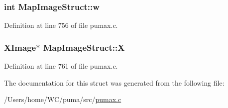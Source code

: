 \hypertarget{struct_map_image_struct_a231ed4c4f5df4b3c414fe643d139bea8}{
\subsubsection[{w}]{\setlength{\rightskip}{0pt plus 5cm}int {\bf \-Map\-Image\-Struct\-::w}}}
\label{struct_map_image_struct_a231ed4c4f5df4b3c414fe643d139bea8}


\-Definition at line 756 of file pumax.\-c.

\hypertarget{struct_map_image_struct_aaa7ba55126fe38d8113c9143d2528560}{
\subsubsection[{\-X}]{\setlength{\rightskip}{0pt plus 5cm}\-X\-Image$\ast$ {\bf \-Map\-Image\-Struct\-::\-X}}}
\label{struct_map_image_struct_aaa7ba55126fe38d8113c9143d2528560}


\-Definition at line 761 of file pumax.\-c.



\-The documentation for this struct was generated from the following file\-:\begin{DoxyCompactItemize}
\item 
/\-Users/home/\-W\-C/puma/src/\hyperlink{pumax_8c}{pumax.\-c}\end{DoxyCompactItemize}
